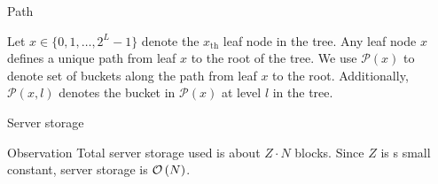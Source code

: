 		\begin{frame}{Path}
			
			Let $x \in \{ 0, 1, \ldots, 2^L - 1 \}$ denote the $x_{\text{th}}$ leaf node in the tree. 
			Any leaf node $x$ defines a unique path from leaf $x$ to the root of the tree.
			We use $\mathcal{P}(x)$ to denote set of buckets along the path from leaf $x$ to the root. 
			Additionally, $\mathcal{P}(x,l)$ denotes the bucket in $\mathcal{P}(x)$ at level $l$ in the tree.

		\end{frame}

		\begin{frame}{Server storage}
			
			\begin{block}{Observation}
				Total server storage used is about $Z \cdot N$ blocks.
				Since $Z$ is s small constant, server storage is $\mathcal{O}\left(N\right)$.
			\end{block} 

		\end{frame}
